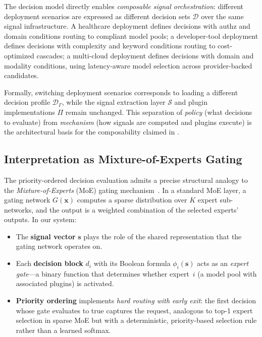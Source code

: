 The decision model directly enables \emph{composable signal orchestration}: different deployment scenarios are expressed as different decision sets $\mathcal{D}$ over the same signal infrastructure.
A healthcare deployment defines decisions with authz and domain conditions routing to compliant model pools; a developer-tool deployment defines decisions with complexity and keyword conditions routing to cost-optimized cascades; a multi-cloud deployment defines decisions with domain and modality conditions, using latency-aware model selection across provider-backed candidates.

Formally, switching deployment scenarios corresponds to loading a different decision profile $\mathcal{D}_\Gamma$, while the signal extraction layer $\mathcal{S}$ and plugin implementations $\Pi$ remain unchanged.
This separation of \emph{policy} (what decisions to evaluate) from \emph{mechanism} (how signals are computed and plugins execute) is the architectural basis for the composability claimed in .


\subsection{Interpretation as Mixture-of-Experts Gating}
\label{sec:disc_moe}

The priority-ordered decision evaluation admits a precise structural analogy to the \emph{Mixture-of-Experts} (MoE) gating mechanism~\cite{shazeer2017moe}.
In a standard MoE layer, a gating network $G(\mathbf{x})$ computes a sparse distribution over $K$ expert sub-networks, and the output is a weighted combination of the selected experts' outputs.
In our system:

\begin{itemize}
  \item The \textbf{signal vector} $\mathbf{s}$ plays the role of the shared representation that the gating network operates on.
  \item Each \textbf{decision block} $d_i$ with its Boolean formula $\phi_i(\mathbf{s})$ acts as an \emph{expert gate}---a binary function that determines whether expert~$i$ (a model pool with associated plugins) is activated.
  \item \textbf{Priority ordering} implements \emph{hard routing with early exit}: the first decision whose gate evaluates to true captures the request, analogous to top-1 expert selection in sparse MoE but with a deterministic, priority-based selection rule rather than a learned softmax.
\end{itemize}

